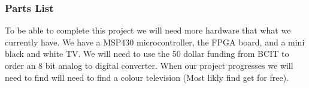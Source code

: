 \subsubsection*{Parts List}

To be able to complete this project we will need more hardware that what we 
currently have. We have a MSP430 microcontroller, the FPGA board, and a mini
black and white TV. We will need to use the 50 dollar funding from BCIT to order
an 8 bit analog to digital converter. When our project progresses we will need 
to find will need to find a colour television (Most likly find get for free).

